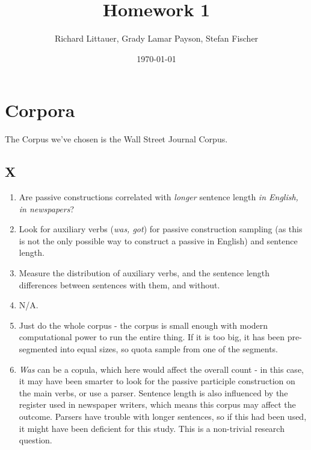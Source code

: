 \documentclass[11pt]{article}
\title{Homework 1}
\author{Richard Littauer, Grady Lamar Payson, Stefan Fischer}
\date{\today}                          		%
\begin{document}
\maketitle

\section{Corpora}
The Corpus we've chosen is the Wall Street Journal Corpus.
\subsection{X}
\begin{enumerate}
\item Are passive constructions correlated with {\it longer} sentence length {\it in English, in newspapers}?
\item Look for auxiliary verbs ({\it was, got}) for passive construction sampling (as this is not the only possible way to construct a passive in English) and sentence length.
\item Measure the distribution of auxiliary verbs, and the sentence length differences between sentences with them, and without. 
\item N/A.
\item Just do the whole corpus - the corpus is small enough with modern computational power to run the entire thing. If it is too big, it has been pre-segmented into equal sizes, so quota sample from one of the segments. 
\item {\it Was} can be a copula, which here would affect the overall count - in this case, it may have been smarter to look for the passive participle construction on the main verbs, or use a parser. Sentence length is also influenced by the register used in newspaper writers, which means this corpus may affect the outcome. Parsers have trouble with longer sentences, so if this had been used, it might have been deficient for this study. This is a non-trivial research question. 
\end{enumerate}
\end{document}
